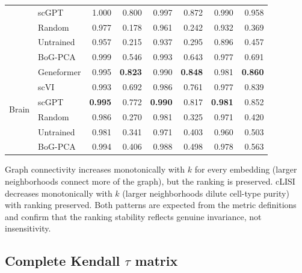 \documentclass[9pt,lineno]{elife}
\begin{document}
\begin{table}[h!]
\begin{tabular}{@{}ll rr rr rr@{}}
 & scGPT      & 1.000 & 0.800 & 0.997 & 0.872 & 0.990 & 0.958 \\
 & Random     & 0.977 & 0.178 & 0.961 & 0.242 & 0.932 & 0.369 \\
 & Untrained  & 0.957 & 0.215 & 0.937 & 0.295 & 0.896 & 0.457 \\
 & BoG-PCA    & 0.999 & 0.546 & 0.993 & 0.643 & 0.977 & 0.691 \\
\midrule
\multirow{6}{*}{Brain}
 & Geneformer & 0.995 & \textbf{0.823} & 0.990 & \textbf{0.848} & 0.981 & \textbf{0.860} \\
 & scVI       & 0.993 & 0.692 & 0.986 & 0.761 & 0.977 & 0.839 \\
 & scGPT      & \textbf{0.995} & 0.772 & \textbf{0.990} & 0.817 & \textbf{0.981} & 0.852 \\
 & Random     & 0.986 & 0.270 & 0.981 & 0.325 & 0.971 & 0.420 \\
 & Untrained  & 0.981 & 0.341 & 0.971 & 0.403 & 0.960 & 0.503 \\
 & BoG-PCA    & 0.994 & 0.406 & 0.988 & 0.498 & 0.978 & 0.563 \\
\bottomrule
\end{tabular}
\end{table}

Graph connectivity increases monotonically with $k$ for every embedding (larger neighborhoods connect more of the graph), but the ranking is preserved. cLISI decreases monotonically with $k$ (larger neighborhoods dilute cell-type purity) with ranking preserved. Both patterns are expected from the metric definitions and confirm that the ranking stability reflects genuine invariance, not insensitivity.

\subsection{Complete Kendall $\tau$ matrix}
\end{document}
